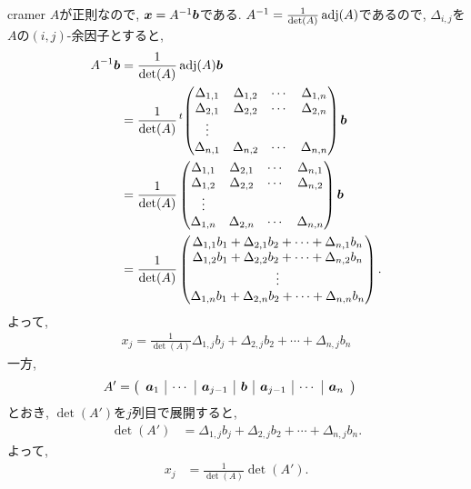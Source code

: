 \begin{proofof}{cramer}
  \label{thm:cramer}
  $A$が正則なので,
  $\boldsymbol{x}=A^{-1}\boldsymbol{b}$である.
  $A^{-1}=\frac{1}{\det(A)}\operatorname{adj}(A)$であるので,
  $\Delta_{i,j}$を$A$の$(i,j)$-余因子とすると,
  \begin{align*}
    A^{-1}\boldsymbol{b}
    &=\frac{1}{\det(A)}\operatorname{adj}(A)\boldsymbol{b}\\
    &=\frac{1}{\det(A)}{\left.^{t}\!
      \begin{pmatrix}
        \Delta_{1,1}&\Delta_{1,2}&\cdots&\Delta_{1,n}\\
        \Delta_{2,1}&\Delta_{2,2}&\cdots&\Delta_{2,n}\\
        \vdots\\
        \Delta_{n,1}&\Delta_{n,2}&\cdots&\Delta_{n,n}
      \end{pmatrix}
      \right.}\boldsymbol{b}\\
    &=\frac{1}{\det(A)}
      \begin{pmatrix}
        \Delta_{1,1}&\Delta_{2,1}&\cdots&\Delta_{n,1}\\
        \Delta_{1,2}&\Delta_{2,2}&\cdots&\Delta_{n,2}\\
        \vdots\\
        \Delta_{1,n}&\Delta_{2,n}&\cdots&\Delta_{n,n}
      \end{pmatrix}
      \boldsymbol{b}\\
    &=\frac{1}{\det(A)}
      \begin{pmatrix}
        \Delta_{1,1}b_1+\Delta_{2,1}b_2+\cdots+\Delta_{n,1}b_n\\
        \Delta_{1,2}b_1+\Delta_{2,2}b_2+\cdots+\Delta_{n,2}b_n\\
        \vdots\\
        \Delta_{1,n}b_1+\Delta_{2,n}b_2+\cdots+\Delta_{n,n}b_n
      \end{pmatrix}.
  \end{align*}
  よって,
  \begin{align*}
    x_j=
    \frac{1}{\det(A)}
    \Delta_{1,j}b_j+\Delta_{2,j}b_2+\cdots+\Delta_{n,j}b_n
  \end{align*}
  一方,
  \begin{align*}
    A'&=
    \left(\begin{array}{c|c|c|c|c|c|c}
      \boldsymbol{a}_1&\cdots&\boldsymbol{a}_{j-1}&\boldsymbol{b}&\boldsymbol{a}_{j-1}&\cdots&\boldsymbol{a}_n
    \end{array}\right)
  \end{align*}
  とおき, $\det(A')$を$j$列目で展開すると,
  \begin{align*}
    \det(A')&=
    \Delta_{1,j}b_j+\Delta_{2,j}b_2+\cdots+\Delta_{n,j}b_n.
  \end{align*}
  よって,
  \begin{align*}
    x_j &= \frac{1}{\det(A)}\det(A').
  \end{align*}
\end{proofof}

